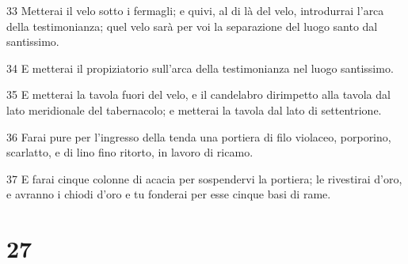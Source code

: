 \par 33 Metterai il velo sotto i fermagli; e quivi, al di là del velo, introdurrai l'arca della testimonianza; quel velo sarà per voi la separazione del luogo santo dal santissimo.
\par 34 E metterai il propiziatorio sull'arca della testimonianza nel luogo santissimo.
\par 35 E metterai la tavola fuori del velo, e il candelabro dirimpetto alla tavola dal lato meridionale del tabernacolo; e metterai la tavola dal lato di settentrione.
\par 36 Farai pure per l'ingresso della tenda una portiera di filo violaceo, porporino, scarlatto, e di lino fino ritorto, in lavoro di ricamo.
\par 37 E farai cinque colonne di acacia per sospendervi la portiera; le rivestirai d'oro, e avranno i chiodi d'oro e tu fonderai per esse cinque basi di rame.

\chapter{27}

